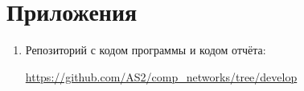 \section{Приложения} \label{app}

\begin{enumerate}
	\item Репозиторий с кодом программы и кодом отчёта:
	
	\href{https://github.com/AS2/comp\_networks/tree/develop}{https://github.com/AS2/comp_networks/tree/develop}

\end{enumerate}
